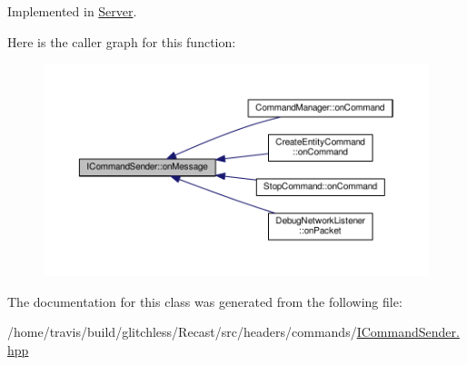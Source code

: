 Implemented in \hyperlink{class_server_a37a56fedea3137e9b8080ee0e86e8278}{Server}.



Here is the caller graph for this function\-:
\nopagebreak
\begin{figure}[H]
\begin{center}
\leavevmode
\includegraphics[width=350pt]{class_i_command_sender_a613b27b190c7fb5123597939c0896080_icgraph}
\end{center}
\end{figure}




The documentation for this class was generated from the following file\-:\begin{DoxyCompactItemize}
\item 
/home/travis/build/glitchless/\-Recast/src/headers/commands/\hyperlink{_i_command_sender_8hpp}{I\-Command\-Sender.\-hpp}\end{DoxyCompactItemize}
